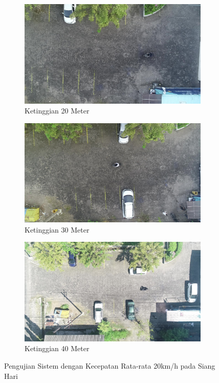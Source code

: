 \begin{figure}[H]
  \centering
  \begin{subfigure}[b]{0.45\textwidth}
    \centering
    \includegraphics[width=\linewidth]{bab4/20m_siang_20km.jpg}
    \caption{Ketinggian 20 Meter}
    \label{fig:20m_siang_20kmh}
  \end{subfigure}%
  \hfill
  \begin{subfigure}[b]{0.45\textwidth}
    \centering
    \includegraphics[width=\linewidth]{bab4/30m_siang_20km.jpg}
    \caption{Ketinggian 30 Meter}
    \label{fig:30m_siang_20kmh}
  \end{subfigure}%
  \hfill
  \begin{subfigure}[b]{0.45\textwidth}
    \centering
    \includegraphics[width=\linewidth]{bab4/40m_siang_20km.jpg}
    \caption{Ketinggian 40 Meter}
    \label{fig:40m_siang_20kmh}
  \end{subfigure}
  \caption{Pengujian Sistem dengan Kecepatan Rata-rata 20km/h pada Siang Hari}
  \label{fig:uji20m_20kmh}
\end{figure}

